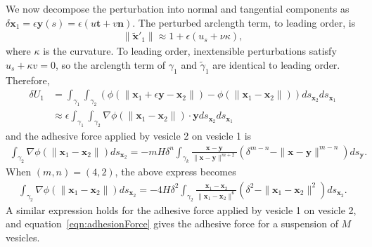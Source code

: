 \documentclass[prf,superscriptaddress,showpacs]{revtex4-1}
\newcommand{\nn}{\mathbf{n}}
\renewcommand{\tt}{\mathbf{t}}
\newcommand{\xx}{\mathbf{x}}
\newcommand{\yy}{\mathbf{y}}
\begin{document}
\begin{appendices}
We now decompose the perturbation into normal and tangential components
as $\delta \xx_1 = \epsilon \yy(s) = \epsilon(u\tt + v\nn)$. The
perturbed arclength term, to leading order, is
\begin{align*}
  \|\tilde{\xx}'_1\| \approx 1 + \epsilon(u_s + \nu\kappa),
\end{align*}
where $\kappa$ is the curvature.  To leading order, inextensible
perturbations satisfy $u_s + \kappa v = 0$, so the arclength term of
$\gamma_1$ and $\tilde{\gamma}_1$ are identical to leading order.
Therefore,
\begin{align*}
  \delta U_1 &= \int_{\gamma_1} \int_{\gamma_2} \left(
  \phi(\|\xx_1 + \epsilon \yy  - \xx_2\|) - \phi(\|\xx_1 - \xx_2\|)
  \right) ds_{\xx_2} ds_{\xx_1} \\
  &\approx \epsilon \int_{\gamma_1} \int_{\gamma_2}
  \nabla \phi (\|\xx_1 - \xx_2\|) \cdot \yy ds_{\xx_2} ds_{\xx_1}
\end{align*}
and the adhesive force applied by vesicle 2 on vesicle 1 is
\begin{align*}
 \int_{\gamma_2}\nabla \phi(\|\xx_1 - \xx_2\|)ds_{\xx_2} = -m   H\delta^{n}
   \int_{\gamma_k} \frac{\xx - \yy}{\|\xx - \yy\|^{m+2}} 
  \left(\delta^{m-n} - \|\xx - \yy\|^{m-n} \right) ds_\yy.
  \end{align*}
When $(m,n) = (4,2)$, the above express becomes
\begin{align*}
  \int_{\gamma_2}\nabla \phi(\|\xx_1 - \xx_2\|)ds_{\xx_2} = 
  -4 H \delta^2 \int_{\gamma_2}
  \frac{\xx_1 - \xx_2}{\|\xx_1 - \xx_2\|^6} 
  \left(\delta^2 - \|\xx_1 - \xx_2\|^2 \right) ds_{\xx_2}.
\end{align*}
A similar expression holds for the adhesive force applied by vesicle 1
on vesicle 2, and equation~\eqref{eqn:adhesionForce} gives the adhesive
force for a suspension of $M$ vesicles.


\end{appendices}
\end{document}
